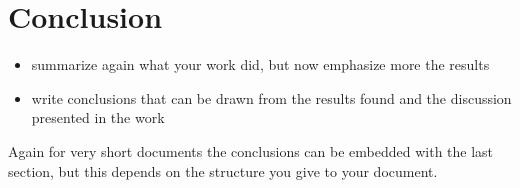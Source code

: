 \section{Conclusion}

\begin{itemize}
\item summarize again what your work did, but now emphasize more the results
\item write conclusions that can be drawn from the results found and the discussion presented in the work
\end{itemize}

Again for very short documents the conclusions can be embedded with the last section, but this depends on the structure you give to your document. 
